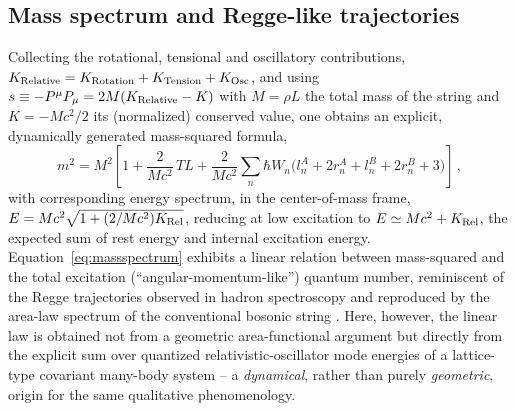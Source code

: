 \documentclass[11pt]{article}
\begin{document}
\subsection{Mass spectrum and Regge-like trajectories}
\label{sec:regge}

Collecting the rotational, tensional and oscillatory contributions,
$K_{\rm Relative}=K_{\rm Rotation}+K_{\rm Tension}+K_{\rm Osc}$, and using
$s\equiv-P^\mu P_\mu=2M(K_{\rm Relative}-K)$ with $M=\rho L$ the total mass of
the string and $K=-Mc^2/2$ its (normalized) conserved value, one obtains an
explicit, dynamically generated mass-squared formula,
\begin{equation}
m^2=M^2\left[1+\frac{2}{Mc^2}\,TL+\frac{2}{Mc^2}\sum_n \hbar W_n
\Big(l_n^A+2r_n^A+l_n^B+2r_n^B+3\Big)\right]\,,
\label{eq:massspectrum}
\end{equation}
with corresponding energy spectrum, in the center-of-mass frame,
$E=Mc^2\sqrt{1+(2/Mc^2)K_{\rm Rel}}$, reducing at low excitation to
$E\simeq Mc^2+K_{\rm Rel}$, the expected sum of rest energy and internal
excitation energy. Equation~\eqref{eq:massspectrum} exhibits a linear relation
between mass-squared and the total excitation (``angular-momentum-like'')
quantum number, reminiscent of the Regge trajectories observed in hadron
spectroscopy and reproduced by the area-law spectrum of the conventional
bosonic string \cite{Polchinski1998}. Here, however, the linear law is obtained
not from a geometric area-functional argument but directly from the explicit
sum over quantized relativistic-oscillator mode energies of a lattice-type
covariant many-body system -- a \emph{dynamical}, rather than purely
\emph{geometric}, origin for the same qualitative phenomenology.
\end{document}
